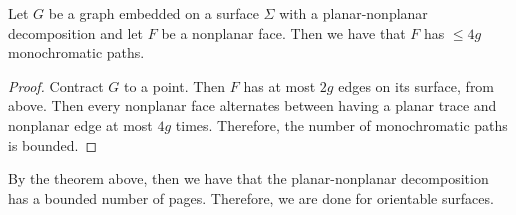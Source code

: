 \begin{corollary}
	Let $G$ be a graph embedded on a surface $\Sigma$ with a planar-nonplanar decomposition and let $F$ be a nonplanar face. Then we have that $F$ has $\leq 4g$ monochromatic paths.
\end{corollary}

\begin{proof}
	Contract $G$ to a point. Then $F$ has at most $2g$ edges on its surface, from above. 
	Then every nonplanar face alternates between having a planar trace and nonplanar edge at most $4g$ times. Therefore, the number of monochromatic paths is bounded.
\end{proof}

By the theorem above, then we have that the planar-nonplanar decomposition has a bounded number of pages. Therefore, we are done for orientable surfaces. 